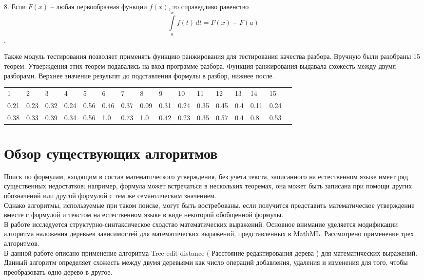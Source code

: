 \documentclass[12pt]{article}
\begin{document}
8. Если  ${\displaystyle F (x)}$ – любая первообразная функции ${\displaystyle f (x)}$,  то справедливо равенство $${\displaystyle \int \limits _a^x f(t)\,dt=F(x)-F(a)}$$ .

Также модуль тестирования позволяет применять функцию ранжирования для тестирования качества разбора. 
Вручную были разобраны 15 теорем. Утверждения этих теорем подавались на вход программе разбора. Функция ранжирования выдавала схожесть между двумя разборами. Верхнее значение результат до подставления формулы в разбор, нижнее после.

\begin{table}[h!]
\begin{tabular}{ l l l l l l l l  l l   l l l l l l  }
1 & 2 & 3 & 4 & 5 & 6 &  7 & 8 & 9 & 10 & 11 & 12 & 13 & 14 & 15\\
0.21 & 0.23 & 0.32 & 0.24 & 0.56 & 0.46 &  0.37 & 0.09 & 0.31 & 0.24 & 0.35 & 0.45 & 0.4 & 0.11 & 0.24\\
0.38 & 0.33 & 0.39 & 0.34 & 0.56 & 1.0 &  0.73 & 1.0 & 0.42 & 0.23 & 0.35 & 0.57 &0.4 & 0.8 & 0.53\\
\end{tabular}
\end{table} 

\newpage
\section{Обзор существующих алгоритмов}
Поиск по формулам, входящим в состав математического утверждения, без учета текста, записанного на естественном языке имеет ряд существенных недостатков: например, формула может встречаться в нескольких теоремах, она может быть записана при помощи других обозначений или другой формулой с тем же семантическим значением. \\

Однако алгоритмы, используемые при таком поиске, могут быть востребованы, если получится представить математическое утверждение вместе с формулой  и текстом на естественном языке в виде некоторой обобщенной формулы.  \\

В работе \cite{Pyshkin} исследуется структурно-синтаксическое сходство математических выражений. Основное внимание уделяется модификации алгоритма наложения деревьев зависимостей для математических выражений, представленных в MathML. Рассмотрено применение трех алгоритмов. \\

В данной работе описано применение алгоритма Tree edit distance ( Расстояние редактирования дерева ) для математических выражений. Данный алгоритм определяет схожесть между двумя деревьями как число операций добавления, удаления и изменения для того, чтобы преобразовать одно дерево в другое. \\
\end{document}
